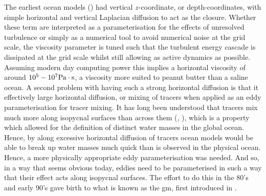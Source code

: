 \documentclass[10pt,a4paper]{article}
\begin{document}
 The earliest ocean models (\cite{bryan1969numerical}) had vertical $z$-coordinate, or depth-coordinates, with simple horizontal and vertical Laplacian diffusion to act as 
 the closure. Whether these term are interpreted as a parameterisation for the effects
 of unresolved turbulence or simply as a numerical tool to avoid numerical noise at 
 the grid scale, the viscosity parameter is tuned such that the turbulent energy cascade is 
 dissipated at the grid scale whilst still allowing as active dynamics as possible. 
 Assuming modern day computing power this implies a horizontal viscosity of around 
 $10^{5} - 10^{7} \rm Pa \cdot s$, a viscosity more suited to peanut butter than 
 a saline ocean. A second problem with having such a strong horizontal diffusion is
 that it effectively large horizontal diffusion, or mixing of tracers when applied as
 an eddy parameterisation for tracer mixing. It has long been understood that tracers 
 mix much more along isopycnal surfaces than across them (\cite{iselin1939influence}, \cite{montgomery1940present}), which is a property which allowed for the definition of
 distinct water masses in the global ocean. Hence, by along excessive horizontal diffusion
 of tracers ocean models would be able to break up water masses much quick than
 is observed in the physical ocean. Hence, a more physically appropriate eddy parameterisation 
 was needed.
  And so, in a way that seems obvious today, eddies need to be
   parameterised in 
 such a way that their effect acts along isopycnal surfaces. 
 The effort to do this in the 80's and early 90's gave birth
 to what is known as the \gls{gm}, first introduced in \cite{gent1990}.
 
\end{document}
